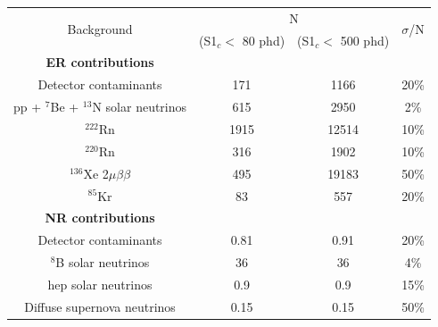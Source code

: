 \begin{table}[]
    \centering
    \begin{tabular}{c|c|c|c}
        \multirow{2}{*}{Background}                  & \multicolumn{2}{|c|}{N}                          & \multirow{2}{*}{$\sigma$/N}  \\ 
                                                     &  (S1$_c <$ 80 phd)     & (S1$_c <$ 500 phd)      &              \\ \hline
        \textbf{ER contributions}                    &                        &                         &   \\
        Detector contaminants                        & 171                    & 1166                    & 20\% \cite{LZ_projected_sensitivity_paper_ref}        \\
        pp + ${}^{7}$Be + ${}^{13}$N solar neutrinos & 615                    & 2950                    & 2\% \cite{pp_solar_neutrinos_rate_ref}       \\
        ${}^{222}$Rn                                 & 1915                   & 12514                   & 10\% \cite{lz_predicted_radon_rate_ref}        \\
        ${}^{220}$Rn                                 & 316                    & 1902                    & 10\% \cite{lz_predicted_radon_rate_ref}        \\
        ${}^{136}$Xe 2$\mu\beta\beta$                & 495                    & 19183                   & 50\% \cite{double_beta_decay_rate_ref}        \\
        ${}^{85}$Kr                                  & 83                     & 557                     & 20\% \cite{kr85_rate_ref}         \\ \hline
        \textbf{NR contributions}                    &                        &                         &   \\
        Detector contaminants                        & 0.81                   & 0.91                    & 20\% \cite{LZ_projected_sensitivity_paper_ref}         \\
        ${}^{8}$B solar neutrinos                    & 36                     & 36                      & 4\%  \cite{b8_neutrino_rate_ref}       \\
        hep solar neutrinos                          & 0.9                    & 0.9                     & 15\% \cite{solar_neutrinos_rate_ref, pp_solar_neutrinos_rate_ref}        \\
        Diffuse supernova neutrinos                  & 0.15                   & 0.15                    & 50\% \cite{dissuse_supernova_neutrinos_rate_ref}        \\

\end{tabular}
\end{table}
